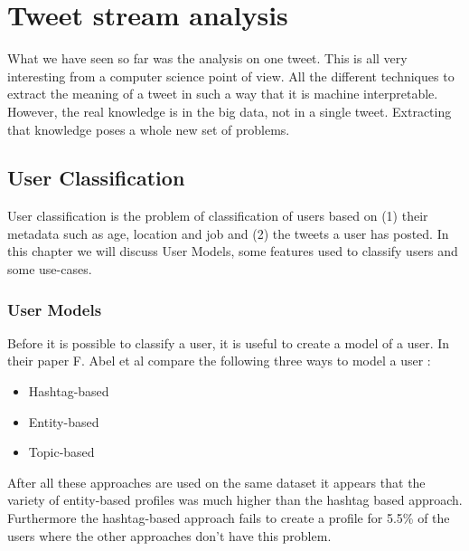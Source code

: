 \documentclass{article}
\begin{document}
\section{Tweet stream analysis}
What we have seen so far was the analysis on one tweet. This is all very interesting from a computer science point of view. All the different techniques to extract the meaning of a tweet in such a way that it is machine interpretable. However, the real knowledge is in the big data, not in a single tweet. Extracting that knowledge poses a whole new set of problems.

\subsection{User Classification}
User classification is the problem of classification of users based on (1) their metadata such as age, location and job and (2) the tweets a user has posted. In this chapter we will discuss User Models, some features used to classify users and some use-cases. 
\subsubsection{User Models}
Before it is possible to classify a user, it is useful to create a model of a user. In their paper F. Abel et al compare the following three ways to model a user \cite{usermodel}:
\begin{itemize}
\item Hashtag-based
\item Entity-based
\item Topic-based

\end{itemize}
After all these approaches are used on the same dataset it appears that the variety of entity-based profiles was much higher than the hashtag based approach. \cite{usermodel} Furthermore the hashtag-based approach fails to create a profile for 5.5\% of the users where the other approaches don't have this problem.  
\end{document}
